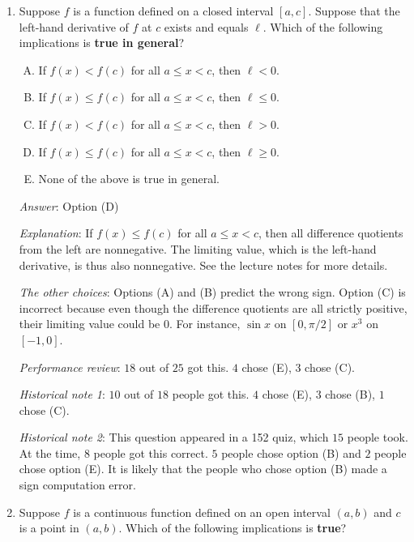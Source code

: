 \documentclass[10pt]{amsart}
\begin{document}
\begin{enumerate}

\item Suppose $f$ is a function defined on a closed interval
  $[a,c]$. Suppose that the left-hand derivative of $f$ at $c$ exists
  and equals $\ell$. Which of the following implications is {\bf true
  in general}?

  \begin{enumerate}[(A)]
  \item If $f(x) < f(c)$ for all $a \le x < c$, then $\ell < 0$.
  \item If $f(x) \le f(c)$ for all $a \le x < c$, then $\ell \le 0$.
  \item If $f(x) < f(c)$ for all $a \le x < c$, then $\ell > 0$.
  \item If $f(x) \le f(c)$ for all $a \le x < c$, then $\ell \ge 0$.
  \item None of the above is true in general.
  \end{enumerate}

  {\em Answer}: Option (D)

  {\em Explanation}: If $f(x) \le f(c)$ for all $a \le x < c$, then
  all difference quotients from the left are nonnegative. The limiting
  value, which is the left-hand derivative, is thus also
  nonnegative. See the lecture notes for more details.

  {\em The other choices}: Options (A) and (B) predict the wrong
  sign. Option (C) is incorrect because even though the difference
  quotients are all strictly positive, their limiting value could be
  $0$. For instance, $\sin x$ on $[0,\pi/2]$ or $x^3$ on $[-1,0]$.

  {\em Performance review}: $18$ out of $25$ got this. $4$ chose (E),
  $3$ chose (C).

  {\em Historical note 1}: $10$ out of $18$ people got this. $4$
  chose (E), $3$ chose (B), $1$ chose (C).

  {\em Historical note 2}: This question appeared in a 152 quiz, which
  $15$ people took. At the time, $8$ people got this correct. $5$
  people chose option (B) and $2$ people chose option (E). It is
  likely that the people who chose option (B) made a sign computation
  error.

\item Suppose $f$ is a continuous function defined on an open interval
  $(a,b)$ and $c$ is a point in $(a,b)$. Which of the following
  implications is {\bf true}?
  \begin{enumerate}[(A)]


\end{enumerate}
\end{enumerate}
\end{document}
